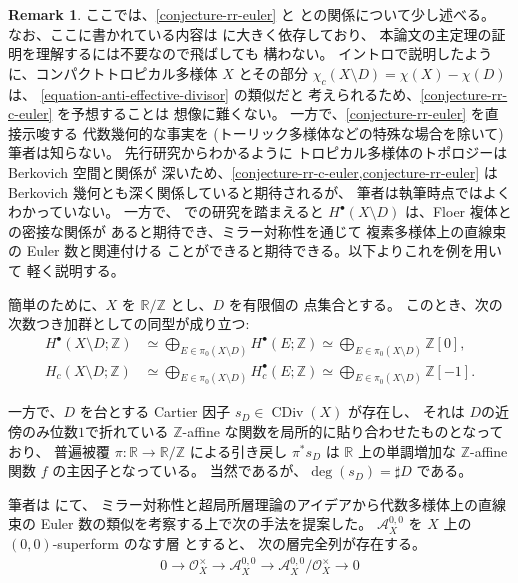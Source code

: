 \documentclass[a4paper,dvipdfmx,reqno,12pt]{amsart}
\theoremstyle{definition}
\newtheorem{remark}[theorem]{Remark}
\newcommand{\opn}[1]{\operatorname{#1}}
\numberwithin{equation}{section}
\begin{document}
\begin{remark}
\label{remark-c-infinity-divisor}
ここでは、\cref{conjecture-rr-euler} と
\cite{tsutsui2023graded}との関係について少し述べる。
なお、ここに書かれている内容は
\cite{tsutsui2023graded}に大きく依存しており、
本論文の主定理の証明を理解するには不要なので飛ばしても
構わない。
イントロで説明したように、コンパクトトロピカル多様体 $X$
とその部分
$\chi_c(X\setminus D)=\chi(X)-\chi(D)$ は、
\cref{equation-anti-effective-divisor} の類似だと
考えられるため、\cref{conjecture-rr-c-euler} を予想することは
想像に難くない。
一方で、\cref{conjecture-rr-euler} を直接示唆する
代数幾何的な事実を (トーリック多様体などの特殊な場合を除いて)
筆者は知らない。
先行研究からわかるように
トロピカル多様体のトポロジーは Berkovich 空間と関係が
深いため、\cref{conjecture-rr-c-euler,conjecture-rr-euler}
は Berkovich 幾何とも深く関係していると期待されるが、
筆者は執筆時点ではよくわかっていない。
一方で、\cite{tsutsui2023graded} での研究を踏まえると
$H^{\bullet}(X\setminus D)$ は、Floer 複体との密接な関係が
あると期待でき、ミラー対称性を通じて
複素多様体上の直線束の Euler 数と関連付ける
ことができると期待できる。以下よりこれを例を用いて
軽く説明する。

簡単のために、$X$ を $\mathbb{R}/\mathbb{Z}$ とし、$D$ を有限個の
点集合とする。
このとき、次の次数つき加群としての同型が成り立つ:
\begin{align}
H^{\bullet}(X\setminus D;\mathbb{Z}) 
&\simeq \bigoplus_{E\in \pi_0(X\setminus D)} 
H^{\bullet}(E;\mathbb{Z})
\simeq \bigoplus_{E\in \pi_0(X\setminus D)} \mathbb{Z}[0], \\
H_c(X\setminus D;\mathbb{Z}) 
&\simeq \bigoplus_{E\in \pi_0(X\setminus D)} 
H^{\bullet}_c(E;\mathbb{Z})
\simeq \bigoplus_{E\in \pi_0(X\setminus D)} \mathbb{Z}[-1].
\end{align}

一方で、$D$ を台とする Cartier 因子
$s_D\in \opn{CDiv}(X)$ が存在し、
それは $D$の近傍のみ位数$1$で折れている
$\mathbb{Z}$-affine な関数を局所的に貼り合わせたものとなっており、
普遍被覆 $\pi\colon \mathbb{R}\to \mathbb{R}/\mathbb{Z}$ 
による引き戻し $\pi^{*}s_D$ は $\mathbb{R}$ 上の単調増加な
$\mathbb{Z}$-affine 関数 $f$ の主因子となっている。
当然であるが、$\opn{deg}(s_D)=\sharp D$ である。

筆者は \cite{tsutsui2023graded} にて、
ミラー対称性と超局所層理論のアイデアから代数多様体上の直線束の
Euler 数の類似を考察する上で次の手法を提案した。
$\mathcal{A}^{0,0}_X$ を $X$ 上の
$(0,0)$-superform のなす層
\cite{MR3903579} とすると、
次の層完全列が存在する。
\begin{align}
0\to \mathcal{O}_X^{\times} \to \mathcal{A}^{0,0}_X
\to \mathcal{A}^{0,0}_X/\mathcal{O}_X^{\times} \to 0
\end{align}


\end{remark}
\end{document}
